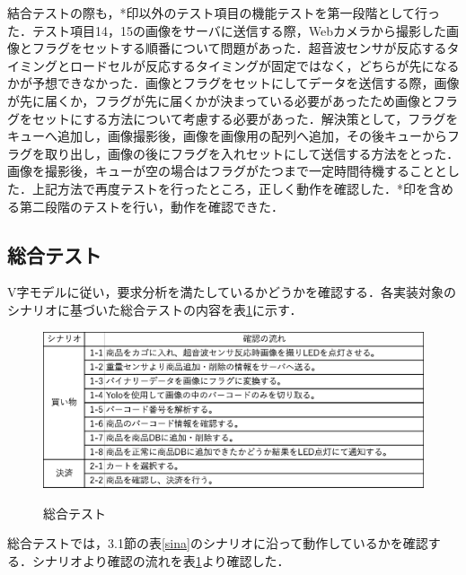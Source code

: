 結合テストの際も，*印以外のテスト項目の機能テストを第一段階として行った．テスト項目14，15の画像をサーバに送信する際，Webカメラから撮影した画像とフラグをセットする順番について問題があった．超音波センサが反応するタイミングとロードセルが反応するタイミングが固定ではなく，どちらが先になるかが予想できなかった．画像とフラグをセットにしてデータを送信する際，画像が先に届くか，フラグが先に届くかが決まっている必要があったため画像とフラグをセットにする方法について考慮する必要があった．解決策として，フラグをキューへ追加し，画像撮影後，画像を画像用の配列へ追加，その後キューからフラグを取り出し，画像の後にフラグを入れセットにして送信する方法をとった．画像を撮影後，キューが空の場合はフラグがたつまで一定時間待機することとした．上記方法で再度テストを行ったところ，正しく動作を確認した．*印を含める第二段階のテストを行い，動作を確認できた．


\subsection{総合テスト}

V字モデルに従い，要求分析を満たしているかどうかを確認する．各実装対象のシナリオに基づいた総合テストの内容を表\ref{sogo}に示す．


\begin{figure}[htbp]
\centering
\caption{総合テスト}
\includegraphics[width = 15cm]{./picture/sogo.eps}
\label{sogo}
\end{figure}

総合テストでは，3.1節の表\ref{sina}のシナリオに沿って動作しているかを確認する．シナリオより確認の流れを表\ref{sogo}より確認した．
